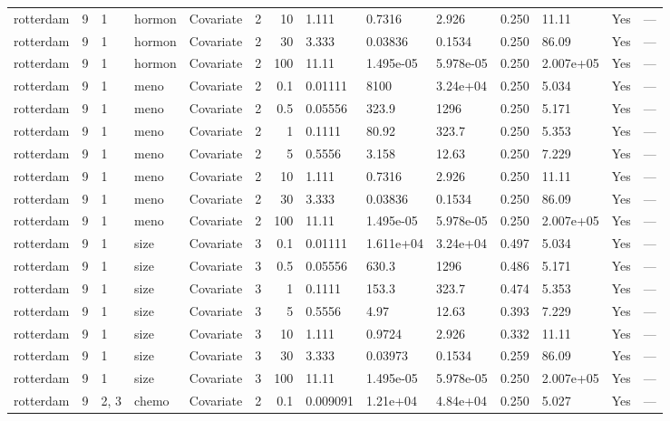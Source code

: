 \begin{tabular}{lrlllrrlllllll}
  rotterdam & 9 & 1 & hormon & Covariate & 2 &    10 & 1.111 & 0.7316 & 2.926 & 0.250 & 11.11 & Yes & --- \\ 
  rotterdam & 9 & 1 & hormon & Covariate & 2 &    30 & 3.333 & 0.03836 & 0.1534 & 0.250 & 86.09 & Yes & --- \\ 
  rotterdam & 9 & 1 & hormon & Covariate & 2 &   100 & 11.11 & 1.495e-05 & 5.978e-05 & 0.250 & 2.007e+05 & Yes & --- \\ 
  rotterdam & 9 & 1 & meno & Covariate & 2 &   0.1 & 0.01111 & 8100 & 3.24e+04 & 0.250 & 5.034 & Yes & --- \\ 
  rotterdam & 9 & 1 & meno & Covariate & 2 &   0.5 & 0.05556 & 323.9 & 1296 & 0.250 & 5.171 & Yes & --- \\ 
  rotterdam & 9 & 1 & meno & Covariate & 2 &     1 & 0.1111 & 80.92 & 323.7 & 0.250 & 5.353 & Yes & --- \\ 
  rotterdam & 9 & 1 & meno & Covariate & 2 &     5 & 0.5556 & 3.158 & 12.63 & 0.250 & 7.229 & Yes & --- \\ 
  rotterdam & 9 & 1 & meno & Covariate & 2 &    10 & 1.111 & 0.7316 & 2.926 & 0.250 & 11.11 & Yes & --- \\ 
  rotterdam & 9 & 1 & meno & Covariate & 2 &    30 & 3.333 & 0.03836 & 0.1534 & 0.250 & 86.09 & Yes & --- \\ 
  rotterdam & 9 & 1 & meno & Covariate & 2 &   100 & 11.11 & 1.495e-05 & 5.978e-05 & 0.250 & 2.007e+05 & Yes & --- \\ 
  rotterdam & 9 & 1 & size & Covariate & 3 &   0.1 & 0.01111 & 1.611e+04 & 3.24e+04 & 0.497 & 5.034 & Yes & --- \\ 
  rotterdam & 9 & 1 & size & Covariate & 3 &   0.5 & 0.05556 & 630.3 & 1296 & 0.486 & 5.171 & Yes & --- \\ 
  rotterdam & 9 & 1 & size & Covariate & 3 &     1 & 0.1111 & 153.3 & 323.7 & 0.474 & 5.353 & Yes & --- \\ 
  rotterdam & 9 & 1 & size & Covariate & 3 &     5 & 0.5556 & 4.97 & 12.63 & 0.393 & 7.229 & Yes & --- \\ 
  rotterdam & 9 & 1 & size & Covariate & 3 &    10 & 1.111 & 0.9724 & 2.926 & 0.332 & 11.11 & Yes & --- \\ 
  rotterdam & 9 & 1 & size & Covariate & 3 &    30 & 3.333 & 0.03973 & 0.1534 & 0.259 & 86.09 & Yes & --- \\ 
  rotterdam & 9 & 1 & size & Covariate & 3 &   100 & 11.11 & 1.495e-05 & 5.978e-05 & 0.250 & 2.007e+05 & Yes & --- \\ 
  rotterdam & 9 & 2, 3 & chemo & Covariate & 2 &   0.1 & 0.009091 & 1.21e+04 & 4.84e+04 & 0.250 & 5.027 & Yes & --- \\ 

\end{tabular}
